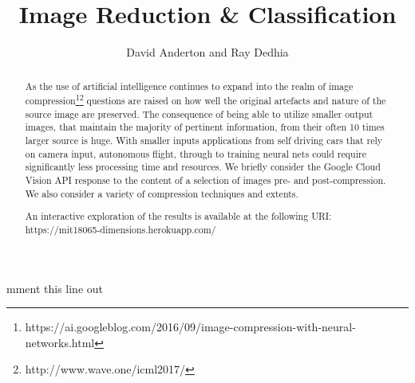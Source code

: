 mment this line out

\IEEEoverridecommandlockouts                              %
\overrideIEEEmargins



\usepackage{csquotes}
\usepackage{graphicx}

\title{\LARGE \bf Image Reduction \& Classification}
\author{David Anderton and Ray Dedhia}





\maketitle
\thispagestyle{empty}
\pagestyle{empty}


\begin{abstract}

As the use of artificial intelligence continues to expand into the realm of image compression\footnote{https://ai.googleblog.com/2016/09/image-compression-with-neural-networks.html}\footnote{http://www.wave.one/icml2017/} questions are raised on how well the original artefacts and nature of the source image are preserved. The consequence of being able to utilize smaller output images, that maintain the majority of pertinent information, from their often 10 times larger source is huge. With smaller inputs applications from self driving cars that rely on camera input, autonomous flight, through to training neural nets could require significantly less processing time and resources.
We briefly consider the Google Cloud Vision API response to the content of a selection of images pre- and post-compression. We also consider a variety of compression techniques and extents.


An interactive exploration of the results is available at the following URI: https://mit18065-dimensions.herokuapp.com/

\end{abstract}

